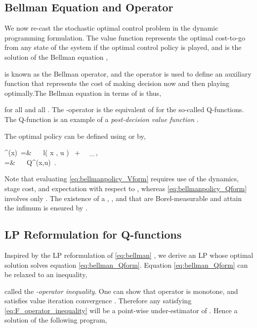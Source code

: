 \documentclass[journal]{IEEEtran}
\newcommand{\mcal}{\mathcal}
\newcommand{\textQ}{Q}
\newcommand{\expval}[2]{\mathbb{E}_{#1}\left[#2\right]}
\newcommand{\argmin}[1]{\underset{#1}{\arg\min}\,\,}
\begin{document}
\subsection{Bellman Equation and Operator} \label{sec:dp_bellman_eq}

We now re-cast the stochastic optimal control problem in the dynamic programming formulation. The value function  represents the optimal cost-to-go from any state of the system if the optimal control policy is played, and is the solution of the Bellman equation \cite{bellman_1952_theory},
	
 is known as the Bellman operator, and the  operator is used to define an auxiliary function  that represents the cost of making decision  now and then playing optimally.The Bellman equation in terms of  is thus,

for all  and all . The -operator is the equivalent of  for the so-called \textQ-functions.
The \textQ-function is an example of a \emph{post-decision value function} \cite[\S 4.6]{powell_ADPBook}.



The optimal policy can be defined using  or  by,

		\pi^\ast(x)
			\,=&\, \argmin{u\in\mcal{U}} \, l\left( x , u \right) \, + \, \gamma \, \expval{}{V^{\ast}\left(g\left(x,u,\xi\right)\right)}
			\,,
			\label{eq:bellmanpolicy_Vform}
		\\
		=&\, \argmin{u\in\mcal{U}} \, Q^{\ast}(x,u)
			\,.
			\label{eq:bellmanpolicy_Qform}
	
Note that evaluating \eqref{eq:bellmanpolicy_Vform} requires use of the dynamics, stage cost, and expectation with respect to , whereas \eqref{eq:bellmanpolicy_Qform} involves only .
The existence of a , , and  that are Borel-measurable and attain the infimum is ensured by \cite[Assumptions 4.2.1(a), 4.2.1(b), 4.2.2]{hernandez_2012_discreteTimeMCP}.




\subsection{LP Reformulation for \textQ-functions} \label{sec:dp_lp}

Inspired by the LP reformulation of \eqref{eq:bellman} \cite{hernandez_2012_discreteTimeMCP}, we derive an LP whose optimal solution  solves equation \eqref{eq:bellman_Qform}.
Equation \eqref{eq:bellman_Qform} can be relaxed to an inequality,
	
called the \emph{-operator inequality}. One can show that operator  is monotone, and satisfies value iteration convergence \cite{vanroy_decentADP}. Therefore any  satisfying \eqref{eq:F_operator_inequality} will be a point-wise under-estimator of .
Hence a solution of the following program,
	
\end{document}
